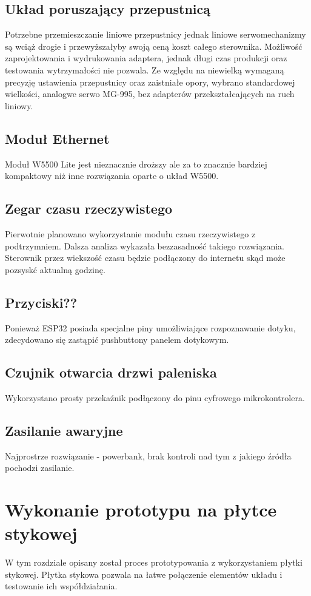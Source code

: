 \documentclass[12pt]{report}
\begin{document}
 \section{Układ poruszający przepustnicą} 
 Potrzebne przemieszczanie liniowe przepustnicy jednak liniowe serwomechanizmy są wciąż drogie i przewyższałyby swoją ceną koszt całego sterownika.
 Możliwość zaprojektowania i wydrukowania adaptera, jednak długi czas produkcji oraz testowania wytrzymałości nie pozwala.
  Ze względu na niewielką wymaganą precyzję ustawienia przepustnicy oraz zaistniałe opory, wybrano standardowej wielkości, analogwe serwo MG-995, bez adapterów przekształcających na ruch liniowy.
 
 \section{Moduł Ethernet}
 Moduł W5500 Lite jest nieznacznie droższy ale za to znacznie bardziej kompaktowy niż inne rozwiązania oparte o układ W5500.
 
 \section{Zegar czasu rzeczywistego}
 Pierwotnie planowano wykorzystanie modułu czasu rzeczywistego z podtrzymniem. Dalsza analiza wykazała bezzasadność takiego rozwiązania. Sterownik przez wiekszość czasu będzie podłączony do internetu skąd może pozsyskć aktualną godzinę.
 
 \section{Przyciski??}
 Ponieważ ESP32 posiada specjalne piny umożliwiające rozpoznawanie dotyku, zdecydowano się zastąpić pushbuttony panelem dotykowym.
 
 \section{Czujnik otwarcia drzwi paleniska}
 Wykorzystano prosty przekaźnik podłączony do pinu cyfrowego mikrokontrolera.
 
 \section{Zasilanie awaryjne}
 Najprostrze rozwiązanie - powerbank, brak kontroli nad tym z jakiego źródła pochodzi zasilanie.
 
 
 \chapter{Wykonanie prototypu na płytce stykowej}
 W tym rozdziale opisany został proces prototypowania z wykorzystaniem płytki stykowej.
 Płytka stykowa pozwala na łatwe połączenie elementów układu i testowanie ich współdziałania.
 
\end{document}
